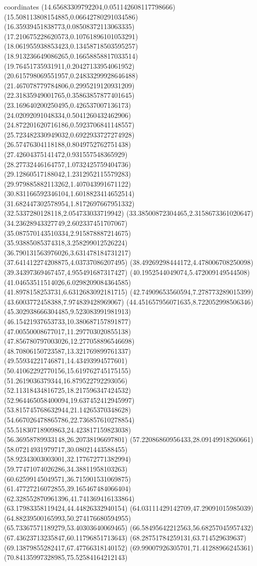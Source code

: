 coordinates {%
(14.65683309792204,0.051142608117798666)
(15.508113808154885,0.06642780291034586)
(16.35939451838773,0.08508372113063335)
(17.210675228620573,0.10761896101053291)
(18.061955938853423,0.13458718503595257)
(18.913236649086265,0.16658858817033514)
(19.76451735931911,0.20427133954061952)
(20.615798069551957,0.24833299928646488)
(21.467078779784806,0.2995219120931209)
(22.31835949001765,0.35863857877401645)
(23.169640200250495,0.426537007136173)
(24.02092091048334,0.5041260432462906)
(24.872201620716186,0.5923706841148557)
(25.723482330949032,0.6922933727274928)
(26.57476304118188,0.8049752762751438)
(27.42604375141472,0.931557548365929)
(28.27732446164757,1.0732425759404736)
(29.12860517188042,1.2312952115579283)
(29.979885882113262,1.407043991671122)
(30.831166592346104,1.6018823414652514)
(31.682447302578954,1.8172697667951332)
(32.5337280128118,2.054733033719942)
(33.38500872304465,2.3158673361020647)
(34.23628943327749,2.602337451707067)
(35.087570143510334,2.915878887214675)
(35.93885085374318,3.258299012526224)
(36.790131563976026,3.631478184731217)
(37.641412274208875,4.03737086207495)
(38.49269298444172,4.478006708250098)
(39.34397369467457,4.955491687317427)
(40.1952544049074,5.472009149544508)
(41.04653511514026,6.0298209084364585)
(41.8978158253731,6.6312683092181715)
(42.74909653560594,7.278773289015399)
(43.6003772458388,7.974839428969067)
(44.451657956071635,8.722052998506346)
(45.302938666304485,9.523083991981913)
(46.15421937653733,10.380687157891877)
(47.00550008677017,11.297703020855138)
(47.856780797003026,12.277058896546698)
(48.70806150723587,13.321769899761337)
(49.55934221746871,14.43493994577601)
(50.41062292770156,15.619762745175155)
(51.2619036379344,16.879522792293056)
(52.11318434816725,18.217596347424532)
(52.964465058400094,19.637452412945997)
(53.815745768632944,21.14265370348628)
(54.667026478865786,22.736857610278854)
(55.51830718909863,24.423817159823038)
(56.36958789933148,26.20738196697801)
(57.22086860956433,28.09149918260661)
(58.07214931979717,30.08021443588455)
(58.92343003003001,32.177672771382994)
(59.77471074026286,34.38811958103263)
(60.62599145049571,36.715901531069875)
(61.47727216072855,39.165467484066404)
(62.328552870961396,41.741369416133864)
(63.17983358119424,44.44826332940154)
(64.03111429142709,47.29091015985039)
(64.88239500165993,50.274176680594955)
(65.73367571189279,53.40303640069465)
(66.58495642212563,56.68257045957432)
(67.43623713235847,60.11796851713643)
(68.28751784259131,63.714529639637)
(69.13879855282417,67.47766318140152)
(69.99007926305701,71.41288966245361)
(70.84135997328985,75.52584164212143)
}
